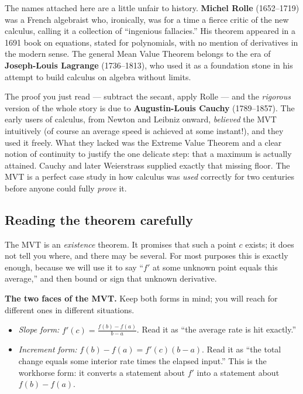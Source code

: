\begin{historybox}
The names attached here are a little unfair to history. \textbf{Michel Rolle}
(1652--1719) was a French algebraist who, ironically, was for a time a fierce critic
of the new calculus, calling it a collection of ``ingenious fallacies.'' His
theorem appeared in a 1691 book on equations, stated for polynomials, with no
mention of derivatives in the modern sense. The general Mean Value Theorem belongs
to the era of \textbf{Joseph-Louis Lagrange} (1736--1813), who used it as a
foundation stone in his attempt to build calculus on algebra without limits.

The proof you just read --- subtract the secant, apply Rolle --- and the
\emph{rigorous} version of the whole story is due to \textbf{Augustin-Louis Cauchy}
(1789--1857). The early users of calculus, from Newton and Leibniz onward,
\emph{believed} the MVT intuitively (of course an average speed is achieved at some
instant!), and they used it freely. What they lacked was the Extreme Value Theorem
and a clear notion of continuity to justify the one delicate step: that a maximum is
actually attained. Cauchy and later Weierstrass supplied exactly that missing
floor. The MVT is a perfect case study in how calculus was \emph{used} correctly for
two centuries before anyone could fully \emph{prove} it.
\end{historybox}

\subsection{Reading the theorem carefully}

The MVT is an \emph{existence} theorem. It promises that such a point $c$ exists; it
does not tell you where, and there may be several. For most purposes this is
exactly enough, because we will use it to say ``$f'$ at some unknown point equals
this average,'' and then bound or sign that unknown derivative.

\begin{focusbox}
\textbf{The two faces of the MVT.} Keep both forms in mind; you will reach for
different ones in different situations.
\begin{itemize}
\item \emph{Slope form:} $\displaystyle f'(c)=\frac{f(b)-f(a)}{b-a}$. Read it as
``the average rate is hit exactly.''
\item \emph{Increment form:} $f(b)-f(a)=f'(c)(b-a)$. Read it as ``the total change
equals some interior rate times the elapsed input.'' This is the workhorse form:
it converts a statement about $f'$ into a statement about $f(b)-f(a)$.
\end{itemize}
\end{focusbox}

